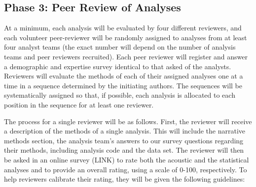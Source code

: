 \documentclass[
  12pt,
]{article}
\begin{document}
\hypertarget{phase-3-peer-review-of-analyses}{%
\subsection{Phase 3: Peer Review of Analyses}\label{phase-3-peer-review-of-analyses}}

At a minimum, each analysis will be evaluated by four different reviewers, and each volunteer peer-reviewer will be randomly assigned to analyses from at least four analyst teams (the exact number will depend on the number of analysis teams and peer reviewers recruited).
Each peer reviewer will register and answer a demographic and expertise survey identical to that asked of the analysts.
Reviewers will evaluate the methods of each of their assigned analyses one at a time in a sequence determined by the initiating authors.
The sequences will be systematically assigned so that, if possible, each analysis is allocated to each position in the sequence for at least one reviewer.

The process for a single reviewer will be as follows.
First, the reviewer will receive a description of the methods of a single analysis.
This will include the narrative methods section, the analysis team's answers to our survey questions regarding their methods, including analysis code and the data set.
The reviewer will then be asked in an online survey (LINK) to rate both the acoustic and the statistical analyses and to provide an overall rating, using a scale of 0-100, respectively.
To help reviewers calibrate their rating, they will be given the following guidelines:
\end{document}
